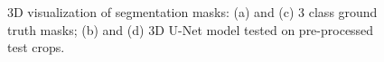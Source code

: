 \begin{figure}[!htb]
\centering
{}\hfil
{}

\hfil 
{}

\caption{\ac{3D} visualization of segmentation masks: (a) and (c) 3 class ground truth masks; (b) and (d) \ac{3D} U-Net model tested on pre-processed test crops.}

\label{fig:results-unet-3channel}

\end{figure}

